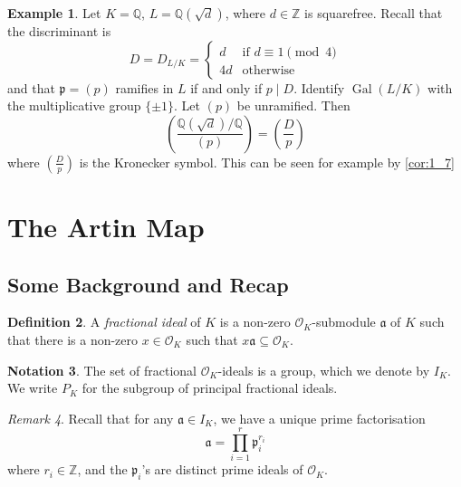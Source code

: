 \documentclass[11pt]{article}
\theoremstyle{definition}
\newtheorem{definition}{Definition}[section]
\newtheorem{example}[definition]{Example}
\newtheorem{notation}[definition]{Notation}
\theoremstyle{plain}
\theoremstyle{remark}
\newtheorem{remark}[definition]{Remark}
\DeclareMathOperator{\Gal}{Gal}
\newcommand{\ZZ}{\mathbb{Z}}
\newcommand{\QQ}{\mathbb{Q}}
\newcommand{\cO}{\mathcal{O}}
\newcommand{\fa}{\mathfrak{a}}
\newcommand{\fp}{\mathfrak{p}}
\newcommand{\leg}[2]{\left(\frac{#1}{#2}\right)}
\begin{document}
\begin{example}\label{eg:1_10}
    Let $K = \QQ$, $L = \QQ(\sqrt{d})$, where $d \in \ZZ$ is squarefree. Recall that the discriminant is
    \begin{equation*}
        D = D_{L/K} =
        \begin{cases}
            d &\text{if } d \equiv 1 \pmod{4}\\
            4d &\text{otherwise}
        \end{cases}
    \end{equation*}
    and that $\fp = (p)$ ramifies in $L$ if and only if $p \mid D$. Identify $\Gal(L/K)$ with the multiplicative group $\{\pm 1\}$. Let $(p)$ be unramified. Then
    \begin{equation*}
        \leg{\QQ(\sqrt{d}) / \QQ}{(p)} = \leg{D}{p}
    \end{equation*}
    where $\leg{D}{p}$ is the Kronecker symbol. {\color{blue} This can be seen for example by \autoref{cor:1_7}}
\end{example}

\section{The Artin Map} %

\subsection{Some Background and Recap}

\begin{definition}\label{def:2_1}
    A \emph{fractional ideal} of $K$ is a non-zero $\cO_K$-submodule $\fa$ of $K$ such that there is a non-zero $x \in \cO_K$ such that $x \fa \subseteq \cO_K$.
\end{definition}

\begin{notation}\label{not:2_2}
    The set of fractional $\cO_K$-ideals is a group, which we denote by $I_K$. We write $P_K$ for the subgroup of principal fractional ideals.
\end{notation}

\begin{remark}\label{rem:2_3}
    Recall that for any $\fa \in I_K$, we have a unique prime factorisation
    \begin{equation}\label{eqn:2_3_fact}
        \fa = \prod_{i=1}^r \fp_i^{r_i}
    \end{equation}
    where $r_i \in \ZZ$, and the $\fp_i$'s are distinct prime ideals of $\cO_K$.
\end{remark}
\end{document}

